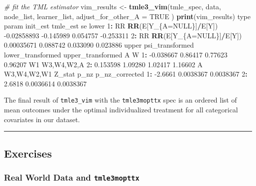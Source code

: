 \documentclass[12pt, krantz2,]{krantz}
\newenvironment{Shaded}{\begin{snugshade}}{\end{snugshade}}
\newcommand{\CommentTok}[1]{\textcolor[rgb]{0.37,0.37,0.37}{\textit{#1}}}
\newcommand{\DataTypeTok}[1]{\textcolor[rgb]{0.27,0.27,0.27}{#1}}
\newcommand{\DecValTok}[1]{\textcolor[rgb]{0.06,0.06,0.06}{#1}}
\newcommand{\FloatTok}[1]{\textcolor[rgb]{0.06,0.06,0.06}{#1}}
\newcommand{\KeywordTok}[1]{\textcolor[rgb]{0.27,0.27,0.27}{\textbf{#1}}}
\newcommand{\NormalTok}[1]{#1}
\newcommand{\OperatorTok}[1]{\textcolor[rgb]{0.43,0.43,0.43}{\textbf{#1}}}
\newcommand{\OtherTok}[1]{\textcolor[rgb]{0.37,0.37,0.37}{#1}}
\newcommand{\StringTok}[1]{\textcolor[rgb]{0.5,0.5,0.5}{#1}}
\theoremstyle{definition}
\theoremstyle{definition}
\theoremstyle{definition}
\newcommand{\1}{\mathbbm{1}}
\begin{document}
\begin{Shaded}
\begin{Highlighting}[]
\CommentTok{# fit the TML estimator}
\NormalTok{vim_results <-}\StringTok{ }\KeywordTok{tmle3_vim}\NormalTok{(tmle_spec, data, node_list, learner_list,}
  \DataTypeTok{adjust_for_other_A =} \OtherTok{TRUE}
\NormalTok{)}
\KeywordTok{print}\NormalTok{(vim_results)}
\NormalTok{   type                  param    init_est  tmle_est       se     lower}
\DecValTok{1}\OperatorTok{:}\StringTok{   }\NormalTok{RR }\KeywordTok{RR}\NormalTok{(E[Y_\{A=}\OtherTok{NULL}\NormalTok{\}]}\OperatorTok{/}\NormalTok{E[Y]) }\FloatTok{-0.02858893} \FloatTok{-0.145989} \FloatTok{0.054757} \FloatTok{-0.253311}
\DecValTok{2}\OperatorTok{:}\StringTok{   }\NormalTok{RR }\KeywordTok{RR}\NormalTok{(E[Y_\{A=}\OtherTok{NULL}\NormalTok{\}]}\OperatorTok{/}\NormalTok{E[Y])  }\FloatTok{0.00035671}  \FloatTok{0.088742} \FloatTok{0.033090}  \FloatTok{0.023886}
\NormalTok{       upper psi_transformed lower_transformed upper_transformed  A           W}
\DecValTok{1}\OperatorTok{:}\StringTok{ }\FloatTok{-0.038667}         \FloatTok{0.86417}           \FloatTok{0.77623}           \FloatTok{0.96207}\NormalTok{ W1  W3,W4,W2,A}
\DecValTok{2}\OperatorTok{:}\StringTok{  }\FloatTok{0.153598}         \FloatTok{1.09280}           \FloatTok{1.02417}           \FloatTok{1.16602}\NormalTok{  A W3,W4,W2,W1}
\NormalTok{    Z_stat      p_nz p_nz_corrected}
\DecValTok{1}\OperatorTok{:}\StringTok{ }\FloatTok{-2.6661} \FloatTok{0.0038367}      \FloatTok{0.0038367}
\DecValTok{2}\OperatorTok{:}\StringTok{  }\FloatTok{2.6818} \FloatTok{0.0036614}      \FloatTok{0.0038367}
\end{Highlighting}
\end{Shaded}

The final result of \texttt{tmle3\_vim} with the \texttt{tmle3mopttx} spec is an ordered list
of mean outcomes under the optimal individualized treatment for all categorical
covariates in our dataset.

\begin{center}\rule{0.5\linewidth}{0.5pt}\end{center}

\hypertarget{exercises-2}{%
\subsection{Exercises}\label{exercises-2}}

\hypertarget{real-world-data-and-tmle3mopttx}{%
\subsubsection{\texorpdfstring{Real World Data and \texttt{tmle3mopttx}}{Real World Data and tmle3mopttx}}\label{real-world-data-and-tmle3mopttx}}
\end{document}
